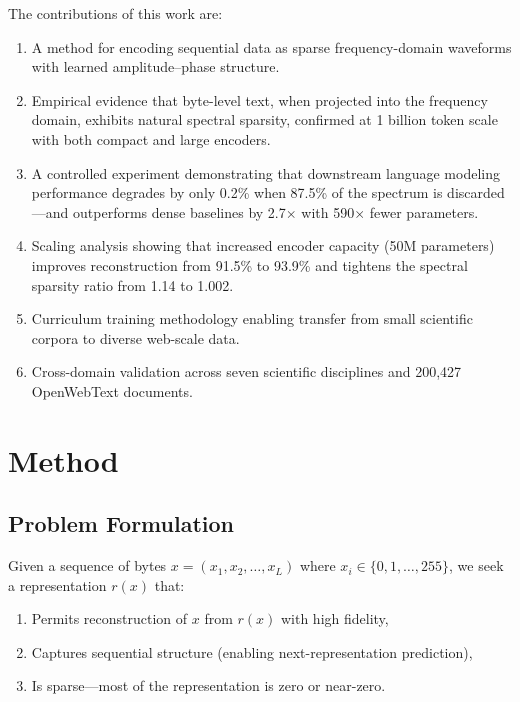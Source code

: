 \documentclass[10pt,twocolumn]{article}
\begin{document}
The contributions of this work are:
\begin{enumerate}[leftmargin=*,nosep]
    \item A method for encoding sequential data as sparse frequency-domain waveforms with learned amplitude--phase structure.
    \item Empirical evidence that byte-level text, when projected into the frequency domain, exhibits natural spectral sparsity, confirmed at 1 billion token scale with both compact and large encoders.
    \item A controlled experiment demonstrating that downstream language modeling performance degrades by only 0.2\% when 87.5\% of the spectrum is discarded---and outperforms dense baselines by 2.7$\times$ with 590$\times$ fewer parameters.
    \item Scaling analysis showing that increased encoder capacity (50M parameters) improves reconstruction from 91.5\% to 93.9\% and tightens the spectral sparsity ratio from 1.14 to 1.002.
    \item Curriculum training methodology enabling transfer from small scientific corpora to diverse web-scale data.
    \item Cross-domain validation across seven scientific disciplines and 200,427 OpenWebText documents.
\end{enumerate}

\section{Method}

\subsection{Problem Formulation}

Given a sequence of bytes $x = (x_1, x_2, \ldots, x_L)$ where $x_i \in \{0, 1, \ldots, 255\}$, we seek a representation $r(x)$ that:
\begin{enumerate}[leftmargin=*,nosep]
    \item Permits reconstruction of $x$ from $r(x)$ with high fidelity,
    \item Captures sequential structure (enabling next-representation prediction),
    \item Is sparse---most of the representation is zero or near-zero.
\end{enumerate}
\end{document}
